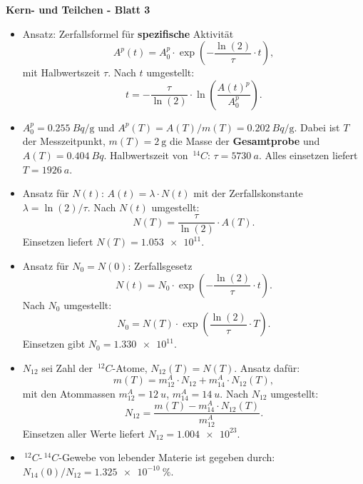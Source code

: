 \documentclass{scrartcl}
\begin{document}
\centerline{\Large\textbf{Kern- und Teilchen - Blatt 3}}
\noindent\makebox[\linewidth]{\rule{11cm}{1pt}}

\aufgabe{}
\subaufgabe{}
\begin{itemize}
        \item Ansatz: Zerfallsformel für \textbf{spezifische} Aktivität
        \[
                A^p(t) = A_0^p\cdot\exp(-\frac{\ln(2)}{\tau}\cdot t),        
        \]
        mit Halbwertszeit $\tau$. Nach $t$ umgestellt:
        \[
                t = -\frac{\tau}{\ln(2)}\cdot\ln(\frac{A(t)^p}{A_0^p}).        
        \]
        \item $A_0^p = \SI{0.255}{Bq\per\g}$ und $A^p(T) = A(T) / m(T) = \SI{0.202}{Bq\per \g}$. Dabei ist $T$ der Messzeitpunkt, $m(T)=\SI{2}{\g}$ die Masse der \textbf{Gesamtprobe} und $A(T)=\SI{0.404}{Bq}$. Halbwertszeit von $\,^{14}C$: $\tau=\SI{5730}{a}$. Alles einsetzen liefert \underline{$T=\SI{1926}{a}$}.
 \end{itemize}

 \subaufgabe{}
 \begin{itemize}
        \item Ansatz für $N(t)$: $A(t) = \lambda\cdot N(t)$ mit der Zerfallskonstante $\lambda = \ln(2) / \tau$. Nach $N(t)$ umgestellt:
        \[
                N(T) = \frac{\tau}{\ln(2)}\cdot A(T).
        \]
        Einsetzen liefert \underline{$N(T) = \num{1.053e11}$}.
        \item Ansatz für $N_0 = N(0)$: Zerfallsgesetz
        \[
                N(t) = N_0\cdot\exp(-\frac{\ln(2)}{\tau}\cdot t).        
        \]
        Nach $N_0$ umgestellt:
        \[
                N_0 = N(T)\cdot\exp(\frac{\ln(2)}{\tau}\cdot T).
        \]
        Einsetzen gibt \underline{$N_0 = \num{1.330e11}$}.
 \end{itemize}

\subaufgabe{}
\begin{itemize}
        \item $N_{12}$ sei Zahl der $\,^{12}C$-Atome, $N_{12}(T) = N(T)$. Ansatz dafür:
        \[
                m(T) = m^A_{12}\cdot N_{12} + m^A_{14}\cdot N_{12}(T),
        \]
        mit den Atommassen $m^A_{12}=\SI{12}{u}$, $m^A_{14}=\SI{14}{u}$. Nach $N_12$ umgestellt:
        \[
                N_{12} = \frac{m(T) - m^A_{14}\cdot N_{12}(T)}{m^A_12}.        
        \]
        Einsetzen aller Werte liefert \underline{$N_12 = \num{1.004e23}$}.
        \item $\,^{12}C$-$\,^{14}C$-Gewebe von lebender Materie ist gegeben durch: \underline{$N_{14}(0) / N_{12} = \SI{1.325e-10}{\percent}$}.
\end{itemize}
\end{document}
